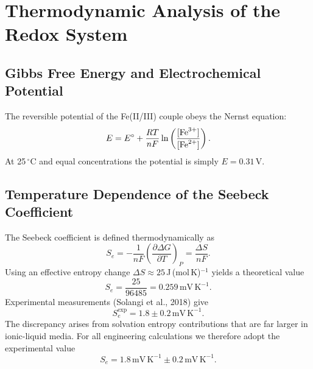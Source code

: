 \documentclass[11pt,a4paper]{article}
\begin{document}
\section{Thermodynamic Analysis of the Redox System}

\subsection{Gibbs Free Energy and Electrochemical Potential}
The reversible potential of the Fe(II/III) couple obeys the Nernst equation:
\begin{equation}
E=E^\circ+\frac{RT}{nF}\ln\left(\frac{[\ce{Fe^{3+}}]}{[\ce{Fe^{2+}}]}\right).
\label{eq:nernst}
\end{equation}
At 25\,$^\circ$C and equal concentrations the potential is simply $E=0.31$\,V.

\subsection{Temperature Dependence of the Seebeck Coefficient}
The Seebeck coefficient is defined thermodynamically as
\begin{equation}
S_e=-\frac{1}{nF}\left(\frac{\partial\Delta G}{\partial T}\right)_P=\frac{\Delta S}{nF}.
\label{eq:seebeck_thermo}
\end{equation}
Using an effective entropy change $\Delta S\approx25$\,J\,(mol\,K)$^{-1}$ yields a theoretical value
\begin{equation}
S_e=\frac{25}{96485}=0.259\,\mathrm{mV\,K^{-1}}.
\label{eq:se_theoretical}
\end{equation}
Experimental measurements (Solangi et al., 2018) give
\begin{equation}
S_e^{\mathrm{exp}}=1.8\pm0.2\,\mathrm{mV\,K^{-1}}.
\label{eq:se_experimental}
\end{equation}
The discrepancy arises from solvation entropy contributions that are far larger in ionic-liquid media. For all engineering calculations we therefore adopt the experimental value
\begin{equation}
\boxed{S_e=1.8\,\mathrm{mV\,K^{-1}}\pm0.2\,\mathrm{mV\,K^{-1}}}.
\end{equation}

\end{document}
